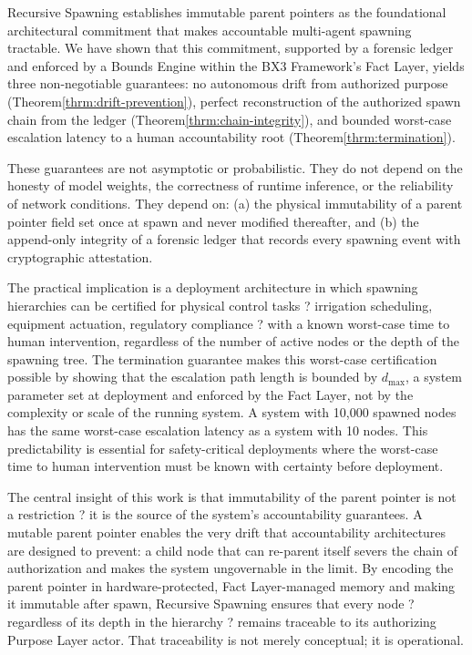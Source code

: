 \documentclass[12pt]{article}
\begin{document}
Recursive Spawning establishes immutable parent pointers as the foundational architectural commitment that makes accountable multi-agent spawning tractable. We have shown that this commitment, supported by a forensic ledger and enforced by a Bounds Engine within the BX3 Framework's Fact Layer, yields three non-negotiable guarantees: no autonomous drift from authorized purpose (Theorem\;\ref{thrm:drift-prevention}), perfect reconstruction of the authorized spawn chain from the ledger (Theorem\;\ref{thrm:chain-integrity}), and bounded worst-case escalation latency to a human accountability root (Theorem\;\ref{thrm:termination}).

These guarantees are not asymptotic or probabilistic. They do not depend on the honesty of model weights, the correctness of runtime inference, or the reliability of network conditions. They depend on: (a) the physical immutability of a parent pointer field set once at spawn and never modified thereafter, and (b) the append-only integrity of a forensic ledger that records every spawning event with cryptographic attestation.

The practical implication is a deployment architecture in which spawning hierarchies can be certified for physical control tasks ? irrigation scheduling, equipment actuation, regulatory compliance ? with a known worst-case time to human intervention, regardless of the number of active nodes or the depth of the spawning tree. The termination guarantee makes this worst-case certification possible by showing that the escalation path length is bounded by $d_{\max}$, a system parameter set at deployment and enforced by the Fact Layer, not by the complexity or scale of the running system. A system with 10,000 spawned nodes has the same worst-case escalation latency as a system with 10 nodes. This predictability is essential for safety-critical deployments where the worst-case time to human intervention must be known with certainty before deployment.

The central insight of this work is that immutability of the parent pointer is not a restriction ? it is the source of the system's accountability guarantees. A mutable parent pointer enables the very drift that accountability architectures are designed to prevent: a child node that can re-parent itself severs the chain of authorization and makes the system ungovernable in the limit. By encoding the parent pointer in hardware-protected, Fact Layer-managed memory and making it immutable after spawn, Recursive Spawning ensures that every node ? regardless of its depth in the hierarchy ? remains traceable to its authorizing Purpose Layer actor. That traceability is not merely conceptual; it is operational.
\end{document}
